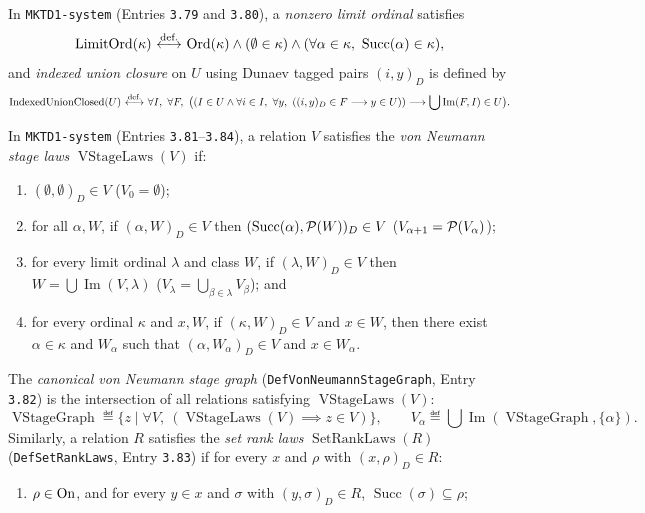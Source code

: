 \begin{definition}
In \texttt{MKTD1-system} (Entries \texttt{3.79} and \texttt{3.80}), a \emph{nonzero limit ordinal} satisfies
\[
\operatorname{LimitOrd}(\kappa) \ {\stackrel{{\textrm{def.}}}{\longleftrightarrow}}\  \mathrm{Ord}(\kappa) \land (\emptyset \in \kappa) \land (\forall \alpha \in \kappa,\ \operatorname{Succ}(\alpha) \in \kappa),
\]
and \emph{indexed union closure} on $U$ using Dunaev tagged pairs $(i, y)_D$ is defined by
\[
\operatorname{IndexedUnionClosed}(U) \ {\stackrel{{\textrm{def.}}}{\longleftrightarrow}}\  \forall I,\ \forall F,\ \bigl((I \in U \land \forall i \in I,\ \forall y,\ ((i, y)_D \in F \longrightarrow y \in U)) \longrightarrow \bigcup\operatorname{Im}(F, I) \in U\bigr).
\]
\end{definition}

\begin{definition}
In \texttt{MKTD1-system} (Entries \texttt{3.81}--\texttt{3.84}), a relation $V$ satisfies the \emph{von Neumann stage laws} $\operatorname{VStageLaws}(V)$ if:
\begin{enumerate}
\item $(\emptyset, \emptyset)_D \in V$ ($V_0 = \emptyset$);
\item for all $\alpha, W$, if $(\alpha, W)_D \in V$ then $(\operatorname{Succ}(\alpha), \mathcal{P}(W))_D \in V$ ($V_{\alpha+1} = \mathcal{P}(V_\alpha)$);
\item for every limit ordinal $\lambda$ and class $W$, if $(\lambda, W)_D \in V$ then $W = \bigcup\operatorname{Im}(V, \lambda)$ ($V_\lambda = \bigcup_{\beta \in \lambda} V_\beta$); and
\item for every ordinal $\kappa$ and $x, W$, if $(\kappa, W)_D \in V$ and $x \in W$, then there exist $\alpha \in \kappa$ and $W_\alpha$ such that $(\alpha, W_\alpha)_D \in V$ and $x \in W_\alpha$.
\end{enumerate}
The \emph{canonical von Neumann stage graph} (\texttt{DefVonNeumannStageGraph}, Entry \texttt{3.82}) is the intersection of all relations satisfying $\operatorname{VStageLaws}(V)$:
\[
\operatorname{VStageGraph} \eqdef \{z \mid \forall V,\ (\operatorname{VStageLaws}(V) \implies z \in V)\},
\qquad
V_\alpha \eqdef \bigcup\operatorname{Im}(\operatorname{VStageGraph}, \{\alpha\}).
\]
Similarly, a relation $R$ satisfies the \emph{set rank laws} $\operatorname{SetRankLaws}(R)$ (\texttt{DefSetRankLaws}, Entry \texttt{3.83}) if for every $x$ and $\rho$ with $(x, \rho)_D \in R$:
\begin{enumerate}
\item $\rho \in \mathrm{On}$, and for every $y \in x$ and $\sigma$ with $(y, \sigma)_D \in R$, $\operatorname{Succ}(\sigma) \subseteq \rho$;

\end{enumerate}
\end{definition}
